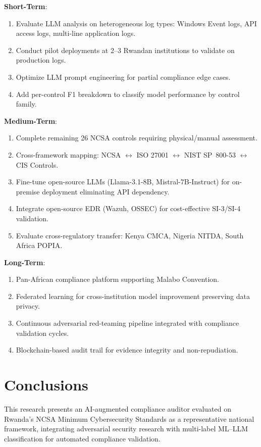 \documentclass[futureinternet,article,submit,pdftex,moreauthors]{Definitions/mdpi}
\begin{document}
\textbf{Short-Term}:
\begin{enumerate}
\item Evaluate LLM analysis on heterogeneous log types: Windows Event logs, API access logs,
multi-line application logs.
\item Conduct pilot deployments at 2--3 Rwandan institutions to validate on production logs.
\item Optimize LLM prompt engineering for partial compliance edge cases.
\item Add per-control F1 breakdown to classify model performance by control family.
\end{enumerate}

\textbf{Medium-Term}:
\begin{enumerate}
\item Complete remaining 26 NCSA controls requiring physical/manual assessment.
\item Cross-framework mapping: NCSA $\leftrightarrow$ ISO 27001 $\leftrightarrow$ NIST
SP~800-53 $\leftrightarrow$ CIS Controls.
\item Fine-tune open-source LLMs (Llama-3.1-8B, Mistral-7B-Instruct) for on-premise
deployment eliminating API dependency.
\item Integrate open-source EDR (Wazuh, OSSEC) for cost-effective SI-3/SI-4 validation.
\item Evaluate cross-regulatory transfer: Kenya CMCA, Nigeria NITDA, South Africa POPIA.
\end{enumerate}

\textbf{Long-Term}:
\begin{enumerate}
\item Pan-African compliance platform supporting Malabo Convention.
\item Federated learning for cross-institution model improvement preserving data privacy.
\item Continuous adversarial red-teaming pipeline integrated with compliance validation cycles.
\item Blockchain-based audit trail for evidence integrity and non-repudiation.
\end{enumerate}

\section{Conclusions}
\label{sec:conclusion}

This research presents an AI-augmented compliance auditor evaluated on Rwanda's NCSA Minimum
Cybersecurity Standards as a representative national framework, integrating adversarial
security research with multi-label ML--LLM classification for automated compliance validation.
\end{document}
